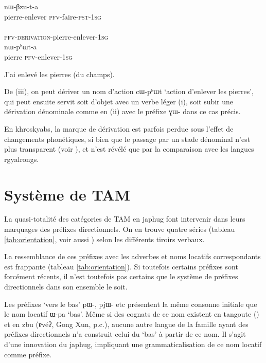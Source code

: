 \documentclass[oldfontcommands,oneside,a4paper,11pt]{article}
\newcommand{\ipa}[1]{{\phon \mbox{#1}}} %
\begin{document}
   \begin{exe}
\ex \label{ex:incorporation}
\begin{xlist}[(ii)]
\gll     \ipa{cɯ-pʰɯt} \ipa{nɯ-βzu-t-a}  \\
 pierre-enlever \textsc{pfv}-faire-\textsc{pst-1sg} \\
\gll     \ipa{nɯ-ɣɯ-cɯ-pʰɯt-a}  \\
  \textsc{pfv}-\textsc{derivation}-pierre-enlever-\textsc{1sg} \\
\gll     \ipa{cɯ} \ipa{nɯ-pʰɯt-a}  \\
  pierre \textsc{pfv}-enlever-\textsc{1sg} \\
  \end{xlist}
 \glt  J'ai enlevé les pierres (du champs).
 
\end{exe}   


De (iii), on peut dériver un nom d'action \ipa{cɯ-pʰɯt} `action d'enlever les pierres', qui peut ensuite servit soit d'objet avec un verbe léger (i), soit subir une dérivation dénominale comme en (ii) avec le préfixe \ipa{ɣɯ-} dans ce cas précis.


En khroskyabs, la marque de dérivation est parfois perdue sous l'effet de changements phonétiques, si bien que le passage par un stade dénominal n'est plus transparent (voir \citealt[185-9]{lai13affixale}), et n'est révélé que par la comparaison avec les langues rgyalrongs.

\section{Système de TAM}
La quasi-totalité des catégories de TAM en japhug font intervenir dans leurs marquages des préfixes directionnels. On en trouve quatre séries (tableau \ref{tab:orientation}, voir aussi \citealt[266]{jacques14linking}) selon les différents tiroirs verbaux. 

La ressemblance de ces préfixes avec les adverbes et noms locatifs correspondants est frappante (tableau \ref{tab:orientation}). Si toutefois certains préfixes sont forcément récents, il n'est toutefois pas certains que le système de préfixes directionnels dans son ensemble le soit.

Les préfixes `vers le bas' \ipa{pɯ-}, \ipa{pjɯ-} etc présentent la même consonne initiale que le nom locatif \ipa{ɯ-pa} `bas'. Même si des cognats de ce nom existent en tangoute (\citealt{jacques14tangoute}) et en zbu (\ipa{ɐvéʔ}, Gong Xun, p.c.), aucune autre langue de la famille ayant des préfixes directionnels n'a construit celui du `bas' à partir de ce nom. Il s'agit d'une innovation du japhug, impliquant une grammaticalisation de ce nom locatif comme préfixe.
\end{document}
